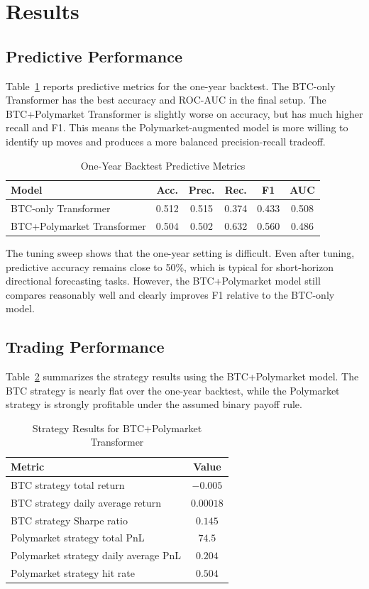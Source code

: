 \documentclass[conference]{IEEEtran}
\begin{document}
\section{Results}
\subsection{Predictive Performance}
Table~\ref{tab:metrics} reports predictive metrics for the one-year backtest. The BTC-only Transformer has the best accuracy and ROC-AUC in the final setup. The BTC+Polymarket Transformer is slightly worse on accuracy, but has much higher recall and F1. This means the Polymarket-augmented model is more willing to identify up moves and produces a more balanced precision-recall tradeoff.

\begin{table}[htbp]
\caption{One-Year Backtest Predictive Metrics}
\label{tab:metrics}
\centering
\begin{tabular}{lccccc}
\toprule
Model & Acc. & Prec. & Rec. & F1 & AUC \\
\midrule
BTC-only Transformer & 0.512 & 0.515 & 0.374 & 0.433 & 0.508 \\
BTC+Polymarket Transformer & 0.504 & 0.502 & 0.632 & 0.560 & 0.486 \\
\bottomrule
\end{tabular}
\end{table}

The tuning sweep shows that the one-year setting is difficult. Even after tuning, predictive accuracy remains close to 50\%, which is typical for short-horizon directional forecasting tasks. However, the BTC+Polymarket model still compares reasonably well and clearly improves F1 relative to the BTC-only model.

\subsection{Trading Performance}
Table~\ref{tab:strategy} summarizes the strategy results using the BTC+Polymarket model. The BTC strategy is nearly flat over the one-year backtest, while the Polymarket strategy is strongly profitable under the assumed binary payoff rule.

\begin{table}[htbp]
\caption{Strategy Results for BTC+Polymarket Transformer}
\label{tab:strategy}
\centering
\begin{tabular}{lc}
\toprule
Metric & Value \\
\midrule
BTC strategy total return & $-0.005$ \\
BTC strategy daily average return & $0.00018$ \\
BTC strategy Sharpe ratio & $0.145$ \\
Polymarket strategy total PnL & $74.5$ \\
Polymarket strategy daily average PnL & $0.204$ \\
Polymarket strategy hit rate & $0.504$ \\
\bottomrule
\end{tabular}
\end{table}
\end{document}

